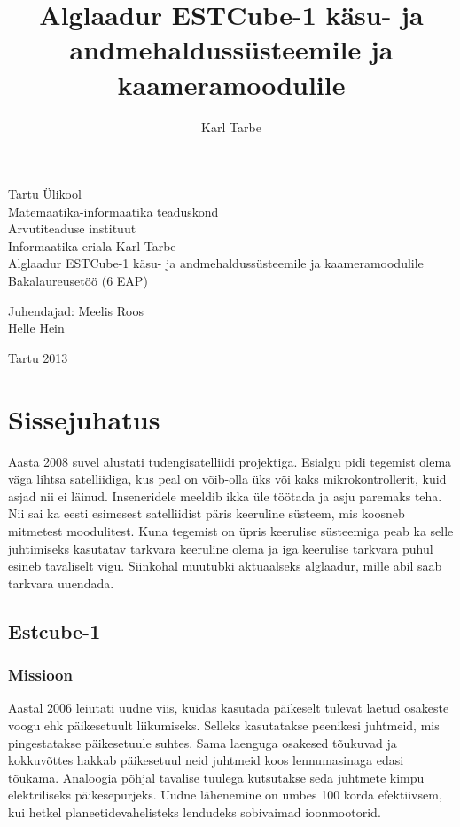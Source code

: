 \documentclass[12pt,a4paper]{article}
\title{Alglaadur ESTCube-1 käsu- ja andmehaldussüsteemile ja kaameramoodulile}
\author{Karl Tarbe}
\begin{document}
\begin{titlepage}
\begin{center}
Tartu Ülikool\\
Matemaatika-informaatika teaduskond\\
Arvutiteaduse instituut\\
Informaatika eriala
\vfill
Karl Tarbe\\[1cm]
Alglaadur ESTCube-1 käsu- ja andmehaldussüsteemile ja kaameramoodulile\\[4mm]
Bakalaureusetöö (6 EAP)
\vspace{2cm}
\begin{flushright}
	Juhendajad: Meelis Roos\\
	Helle Hein
\end{flushright}
\vfill
Tartu 2013
\end{center}
\end{titlepage}
\tableofcontents

\section{Sissejuhatus}
Aasta 2008 suvel alustati tudengisatelliidi projektiga. Esialgu pidi tegemist
olema väga lihtsa satelliidiga, kus peal on võib-olla üks või kaks
mikrokontrollerit, kuid asjad nii ei läinud. Inseneridele meeldib ikka üle
töötada ja asju paremaks teha. Nii sai ka eesti esimesest satelliidist päris
keeruline süsteem, mis koosneb mitmetest moodulitest. Kuna tegemist on üpris
keerulise süsteemiga peab ka selle juhtimiseks kasutatav tarkvara keeruline
olema ja iga keerulise tarkvara puhul esineb tavaliselt vigu. Siinkohal muutubki
aktuaalseks alglaadur, mille abil saab tarkvara uuendada.

\subsection{Estcube-1}
\subsubsection{Missioon}
Aastal 2006 leiutati uudne viis, kuidas kasutada päikeselt tulevat laetud
osakeste voogu ehk päikesetuult liikumiseks. Selleks kasutatakse peenikesi
juhtmeid, mis pingestatakse päikesetuule suhtes. Sama laenguga osakesed tõukuvad
ja kokkuvõttes hakkab päikesetuul neid juhtmeid koos lennumasinaga edasi
tõukama. Analoogia põhjal tavalise tuulega kutsutakse seda juhtmete kimpu
elektriliseks päikesepurjeks. Uudne lähenemine on umbes 100 korda efektiivsem,
kui hetkel planeetidevahelisteks lendudeks sobivaimad ioonmootorid.
\cite{errpuri}
\end{document}
